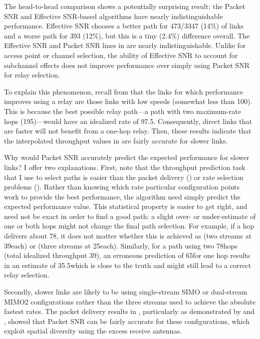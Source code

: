 The head-to-head comparison shows a potentially surprising result: the Packet SNR and Effective SNR-based algorithms have nearly indistinguishable performance. Effective SNR chooses a better path for 473/3347 (14\%) of links and a worse path for 393 (12\%), but this is a tiny (2.4\%) difference overall. The Effective SNR and Packet SNR lines in  are nearly indistinguishable. Unlike for access point or channel selection, the ability of Effective SNR to account for subchannel effects does not improve performance over simply using Packet SNR for relay selection.

To explain this phenomenon, recall from  that the links for which performance improves using a relay are those links with low speeds (somewhat less than 100\Mbps). This is because the best possible relay path---a path with two maximum-rate hops (195\Mbps)---would have an idealized rate of 97.5\Mbps. Consequently, direct links that are faster will not benefit from a one-hop relay. Then, these results indicate that the interpolated throughput values in  are fairly accurate for slower links.

Why would Packet SNR accurately predict the expected performance for slower links? I offer two explanations. First, note that the throughput prediction task that I use to select paths is easier than the packet delivery () or rate selection problems (). Rather than knowing which rate particular configuration points work to provide the best performance, the algorithm need simply predict the expected performance value. This statistical property is easier to get right, and need not be exact in order to find a good path: a slight over- or under-estimate of one or both hops might not change the final path selection. For example, if a hop delivers about 78\Mbps, it does not matter whether this is achieved as  (two streams at 39\Mbps each) or  (three streams at 25\Mbps each). Similarly, for a path using two 78\Mbps hops (total idealized throughput 39\Mbps), an erroneous prediction of 65\Mbps for one hop results in an estimate of 35.5\Mbps which is close to the truth and might still lead to a correct relay selection.

Secondly, slower links are likely to be using single-stream SIMO or dual-stream MIMO2 configurations rather than the three streams used to achieve the absolute fastest rates. The packet delivery results in , particularly as demonstrated by  and , showed that Packet SNR can be fairly accurate for these configurations, which exploit spatial diversity using the excess receive antennas.

